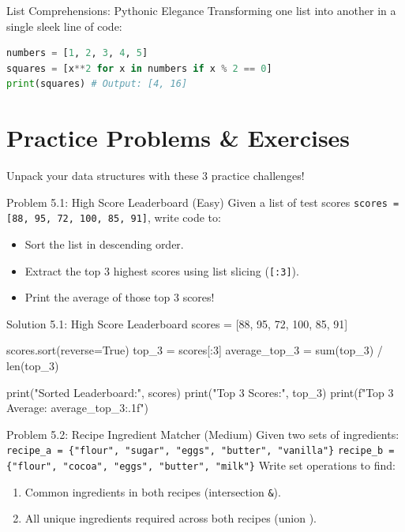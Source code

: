 \begin{snakesnack}{List Comprehensions: Pythonic Elegance}
Transforming one list into another in a single sleek line of code:
\begin{lstlisting}[language=Python]
numbers = [1, 2, 3, 4, 5]
squares = [x**2 for x in numbers if x % 2 == 0]
print(squares) # Output: [4, 16]
\end{lstlisting}
\end{snakesnack}

\section{Practice Problems \& Exercises}

Unpack your data structures with these 3 practice challenges!

\begin{snakelab}{Problem 5.1: High Score Leaderboard (Easy)}
Given a list of test scores \texttt{scores = [88, 95, 72, 100, 85, 91]}, write code to:
\begin{itemize}
    \item Sort the list in descending order.
    \item Extract the top 3 highest scores using list slicing (\texttt{[:3]}).
    \item Print the average of those top 3 scores!
\end{itemize}
\end{snakelab}

\begin{pycode}{Solution 5.1: High Score Leaderboard}
scores = [88, 95, 72, 100, 85, 91]

scores.sort(reverse=True)
top_3 = scores[:3]
average_top_3 = sum(top_3) / len(top_3)

print("Sorted Leaderboard:", scores)
print("Top 3 Scores:", top_3)
print(f"Top 3 Average: {average_top_3:.1f}")
\end{pycode}

\begin{snakelab}{Problem 5.2: Recipe Ingredient Matcher (Medium)}
Given two sets of ingredients:
\texttt{recipe\_a = \{"flour", "sugar", "eggs", "butter", "vanilla"\}}
\texttt{recipe\_b = \{"flour", "cocoa", "eggs", "butter", "milk"\}}
Write set operations to find:
\begin{enumerate}
    \item Common ingredients in both recipes (intersection \texttt{\&}).
    \item All unique ingredients required across both recipes (union \texttt{\textbar}).
\end{enumerate}
\end{snakelab}

